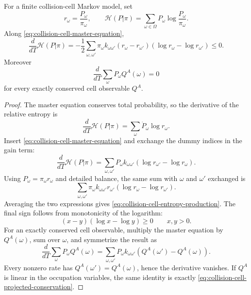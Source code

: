 \begin{lemma}
\label{lem:finite-collision-cell-entropy-identity}
For a finite collision-cell Markov model, set
\[
  r_\omega=\frac{P_\omega}{\pi_\omega},
  \qquad
  \mathcal H(P|\pi)
  =
  \sum_{\omega\in\Omega}
  P_\omega\log\frac{P_\omega}{\pi_\omega}.
\]
Along \eqref{eq:collision-cell-master-equation},
\begin{equation}
  \frac{d}{dT}\mathcal H(P|\pi)
  =
  -
  \frac12
  \sum_{\omega,\omega'}
  \pi_\omega k_{\omega\omega'}
  \left(r_\omega-r_{\omega'}\right)
  \left(\log r_\omega-\log r_{\omega'}\right)
  \le0 .
  \label{eq:collision-cell-entropy-production}
\end{equation}
Moreover
\[
  \frac{d}{dT}\sum_\omega P_\omega Q^A(\omega)=0
\]
for every exactly conserved cell observable \(Q^A\).
\end{lemma}

\begin{proof}
The master equation conserves total probability, so the derivative of the
relative entropy is
\[
  \frac{d}{dT}\mathcal H(P|\pi)
  =
  \sum_\omega \dot P_\omega\log r_\omega .
\]
Insert \eqref{eq:collision-cell-master-equation} and exchange the dummy
indices in the gain term:
\[
  \frac{d}{dT}\mathcal H(P|\pi)
  =
  \sum_{\omega,\omega'}
  P_\omega k_{\omega\omega'}
  \left(\log r_{\omega'}-\log r_\omega\right).
\]
Using \(P_\omega=\pi_\omega r_\omega\) and detailed balance, the same sum
with \(\omega\) and \(\omega'\) exchanged is
\[
  \sum_{\omega,\omega'}
  \pi_\omega k_{\omega\omega'}r_{\omega'}
  \left(\log r_\omega-\log r_{\omega'}\right).
\]
Averaging the two expressions gives
\eqref{eq:collision-cell-entropy-production}.  The final sign follows from
monotonicity of the logarithm:
\[
  (x-y)(\log x-\log y)\ge0
  \qquad x,y>0 .
\]
For an exactly conserved cell observable, multiply the master equation by
\(Q^A(\omega)\), sum over \(\omega\), and symmetrize the result as
\[
  \frac{d}{dT}\sum_\omega P_\omega Q^A(\omega)
  =
  \sum_{\omega,\omega'}
  P_\omega k_{\omega\omega'}
  \left(Q^A(\omega')-Q^A(\omega)\right).
\]
Every nonzero rate has \(Q^A(\omega')=Q^A(\omega)\), hence the derivative
vanishes.  If \(Q^A\) is linear in the occupation variables, the same identity
is exactly \eqref{eq:collision-cell-projected-conservation}.
\end{proof}

